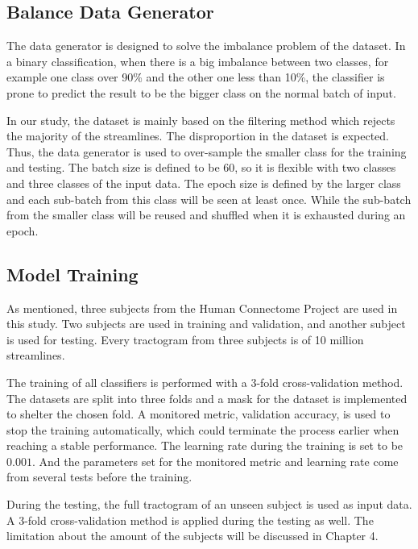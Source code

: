 \subsection{Balance Data Generator}

The data generator is designed to solve the imbalance problem of the dataset. In a binary classification, 
when there is a big imbalance between two classes, for example one class over 90\% and the other one less than 10\%,
the classifier is prone to predict the result to be the bigger class on the normal batch of input. 

In our study, the dataset is mainly based on the filtering method which rejects the majority of the streamlines. 
The disproportion in the dataset is expected. Thus, the data generator is used to over-sample the smaller class for the training and testing.
The batch size is defined to be 60, so it is flexible with two classes and three classes of the input data. 
The epoch size is defined by the larger class and each sub-batch from this class will be seen at least once.
While the sub-batch from the smaller class will be reused and shuffled when it is exhausted during an epoch.

\subsection{Model Training}

As mentioned, three subjects from the Human Connectome Project \cite{vanessenWUMinnHumanConnectome2013} are used in this study.
Two subjects are used in training and validation, and another subject is used for testing. Every tractogram from three subjects is of 10 million streamlines.

The training of all classifiers is performed with a 3-fold cross-validation method. The datasets are split into three folds and a mask for the dataset is 
implemented to shelter the chosen fold. A monitored metric, validation accuracy, is used to stop the training automatically, which could terminate the process earlier when reaching a stable performance.
The learning rate during the training is set to be $0.001$. And the parameters set for the monitored metric and learning rate come from several tests before the training.

During the testing, the full tractogram of an unseen subject is used as input data. 
A 3-fold cross-validation method is applied during the testing as well.
The limitation about the amount of the subjects will be discussed in Chapter 4.








